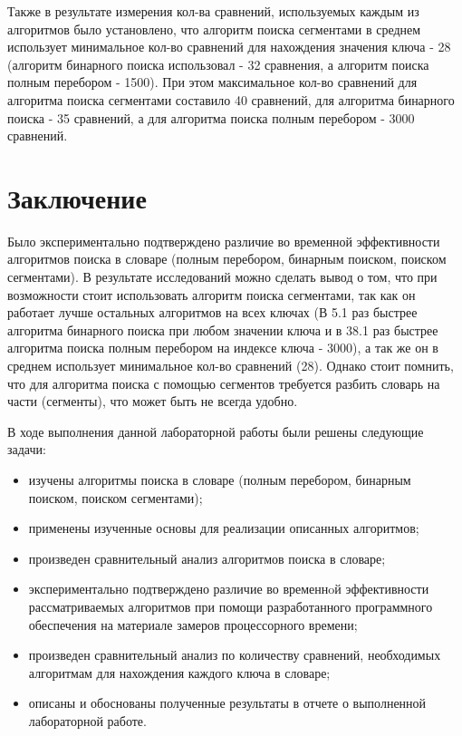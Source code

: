 \documentclass[a4paper,14pt, unknownkeysallowed]{extreport}
\begin{document}
Также в результате измерения кол-ва сравнений, используемых каждым из алгоритмов было установлено, что 
алгоритм поиска сегментами в среднем использует минимальное кол-во сравнений для нахождения значения ключа - 28 (алгоритм бинарного поиска использовал - 32 сравнения, а алгоритм поиска полным перебором - 1500). При этом максимальное кол-во сравнений для алгоритма поиска сегментами составило 40 сравнений, для алгоритма бинарного поиска - 35 сравнений, а для алгоритма поиска полным перебором - 3000 сравнений.





\chapter*{Заключение}

Было экспериментально подтверждено различие во временной эффективности алгоритмов поиска в словаре (полным перебором, бинарным поиском, поиском сегментами). В результате исследований можно сделать вывод о том, что при возможности стоит использовать алгоритм поиска сегментами, так как он работает лучше остальных алгоритмов на всех ключах (В 5.1 раз быстрее алгоритма бинарного поиска при любом значении ключа и в 38.1 раз быстрее алгоритма поиска полным перебором на индексе ключа - 3000), а так же он в среднем использует минимальное кол-во сравнений (28). Однако стоит помнить, что для алгоритма поиска с помощью сегментов требуется разбить словарь на части (сегменты), что может быть не всегда удобно.


\vspace{5mm}

В ходе выполнения данной лабораторной работы были решены следующие задачи:
\begin{itemize}
	\item изучены алгоритмы поиска в словаре (полным перебором, бинарным поиском, поиском сегментами);
	\item применены изученные основы для реализации описанных алгоритмов;
	\item произведен сравнительный анализ алгоритмов поиска в словаре;
	\item экспериментально подтверждено различие во временнoй эффективности рассматриваемых алгоритмов при помощи разработанного программного обеспечения на материале замеров процессорного времени;
	\item произведен сравнительный анализ по количеству сравнений, необходимых алгоритмам для нахождения каждого ключа в словаре;
	\item описаны и обоснованы полученные результаты в отчете о выполненной лабораторной работе.
\end{itemize}
\end{document}
